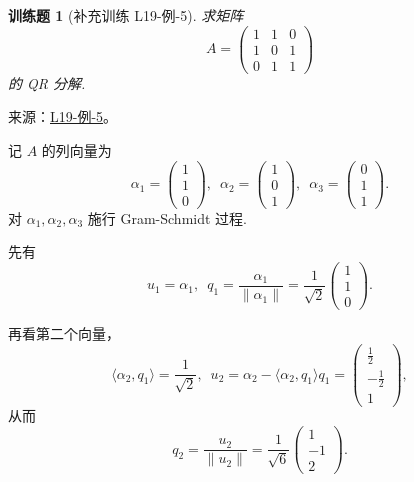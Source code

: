 \documentclass[UTF8,12pt,a4paper,fontset=fandol]{ctexart}
\newtheorem{exercise}{训练题}[section]
\begin{document}
\begin{exercise}[补充训练 L19-例-5]\label{prob:L19-例-5}
求矩阵
    \[
        A = \begin{pmatrix}
            1 & 1 & 0 \\
            1 & 0 & 1 \\
            0 & 1 & 1
        \end{pmatrix}
    \]
    的 QR 分解.
\end{exercise}
\noindent 来源：\href{https://github.com/yhwu-is/Linear-Algebra-Left-Undone/blob/new/%E8%AE%B2%E4%B9%89/%E4%B8%93%E9%A2%98/19%20%E5%86%85%E7%A7%AF%E7%A9%BA%E9%97%B4.tex}{L19-例-5}。
\begin{solve}
记 $A$ 的列向量为
    \[
        \alpha_1 = \begin{pmatrix}
            1 \\
            1 \\
            0
        \end{pmatrix}, \enspace
        \alpha_2 = \begin{pmatrix}
            1 \\
            0 \\
            1
        \end{pmatrix}, \enspace
        \alpha_3 = \begin{pmatrix}
            0 \\
            1 \\
            1
        \end{pmatrix}.
    \]
    对 $\alpha_1, \alpha_2, \alpha_3$ 施行 Gram-Schmidt 过程.

    先有
    \[
        u_1 = \alpha_1, \enspace q_1 = \frac{\alpha_1}{\lVert \alpha_1 \rVert}
        = \frac{1}{\sqrt{2}}
        \begin{pmatrix}
            1 \\
            1 \\
            0
        \end{pmatrix}.
    \]

    再看第二个向量，
    \[
        \langle \alpha_2, q_1 \rangle = \frac{1}{\sqrt{2}}, \enspace
        u_2 = \alpha_2 - \langle \alpha_2, q_1 \rangle q_1
        =
        \begin{pmatrix}
            \frac{1}{2} \\
            -\frac{1}{2} \\
            1
        \end{pmatrix},
    \]
    从而
    \[
        q_2 = \frac{u_2}{\lVert u_2 \rVert}
        = \frac{1}{\sqrt{6}}
        \begin{pmatrix}
            1 \\
            -1 \\
            2
        \end{pmatrix}.
    \]


\end{solve}
\end{document}
